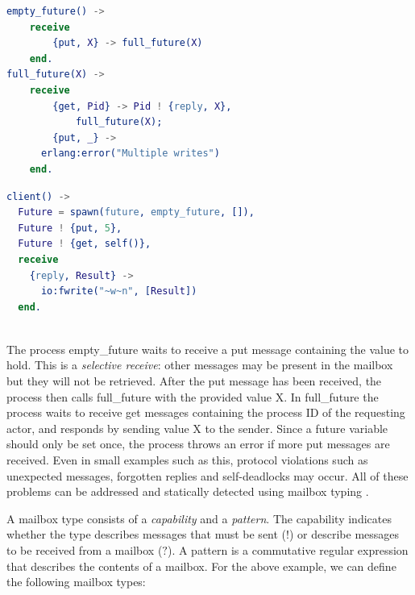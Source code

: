 \begin{minipage}{0.45\linewidth}
\begin{lstlisting}[language=erlang]
empty_future() ->
	receive
		{put, X} -> full_future(X)
	end.
full_future(X) ->
	receive
		{get, Pid} -> Pid ! {reply, X},
			full_future(X);
		{put, _} ->
      erlang:error("Multiple writes")
	end.
\end{lstlisting}
\end{minipage}
\hfill
\begin{minipage}{0.5\linewidth}
\begin{lstlisting}[language=erlang, firstnumber=12]
client() ->
  Future = spawn(future, empty_future, []),
  Future ! {put, 5},
  Future ! {get, self()},
  receive
    {reply, Result} ->
      io:fwrite("~w~n", [Result])
  end.
\end{lstlisting}
\end{minipage}
\\

The process \textsf{empty\_future} waits to receive a \textsf{put} message
containing the value to hold.
This is a \emph{selective receive}: other messages may be present in the mailbox
but they will not be retrieved. After the \textsf{put} message has been
received, the process then calls \textsf{full\_future} with the provided value
\textsf{X}.
%
In \textsf{full\_future} the process waits to
receive \textsf{get} messages containing the process ID of the requesting
actor, and responds by sending value \textsf{X} to
the sender.
%
Since a future variable should only be set once, the process throws an error if
more \textsf{put} messages are received. Even in small
examples such as this, protocol violations such as unexpected messages,
forgotten replies and self-deadlocks may occur. All of these problems can be
addressed and statically detected using mailbox typing
\cite{deliguoroMailboxTypesUnordered2018,fowlerSpecialDeliveryProgramming2023}.

A mailbox type consists of a \emph{capability} and a \emph{pattern}.  The
capability indicates whether the type describes messages that must be sent
($\mathsf{!}$) or describe messages to be received from a mailbox ($\mathsf{?}$).
A pattern is a commutative regular expression that describes the contents of a
mailbox. For the above example, we can define the following mailbox types:


